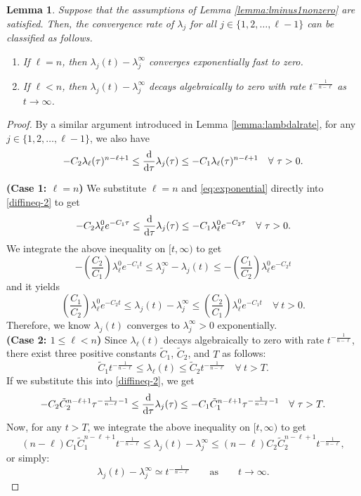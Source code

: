 \documentclass[11pt,reqno]{amsart}
\numberwithin{figure}{section}
\def\d {{\partial}}
\def\d{\mathrm{d}}
\renewcommand{\d}{  {\textup{d}} }
\newtheorem{lemma}{Lemma}[section]
\begin{document}
\begin{lemma}\label{rhodotestimate}
Suppose that the assumptions of Lemma \ref{lemma:lminus1nonzero} are satisfied. Then, the convergence rate of $\lambda_j$ for all $j\in\{1, 2, \dots, \ell-1\}$ can be classified as follows.

\begin{enumerate}
\item If $\ell=n$, then $\lambda_j(t)-\lambda_j^\infty$ converges exponentially fast to zero.

\item If $\ell<n$, then $\lambda_j(t)-\lambda_j^\infty$ decays algebraically to zero with rate $t^{-\frac{1}{n-\ell}}$ as $t\to\infty$.
\end{enumerate}
\end{lemma}


\begin{proof}
By a similar argument introduced in Lemma \ref{lemma:lambdalrate}, for any $j\in\{1, 2, \dots, \ell-1\}$, we also have
\begin{align}\label{diffineq-2}
-C_2\lambda_{\ell}(\tau)^{n-\ell+1}\leq\frac{\d}{\d \tau}\lambda_j(\tau)\leq-C_1\lambda_{\ell}(\tau)^{n-\ell+1}\quad\forall~\tau>0.
\end{align}


\noindent\textbf{(Case 1: $\ell=n$)} We substitute $\ell=n$ and \eqref{eq:exponential} directly into \eqref{diffineq-2} to get
\[
-C_2\lambda_{\ell}^0e^{-C_1\tau}\leq
\frac{\d}{\d \tau}\lambda_j(\tau)\leq-C_1\lambda_{\ell}^0e^{-C_2\tau}
\quad\forall~\tau>0.
\]
We integrate the above inequality on $[t,\infty)$ to get
\[
-\left(\frac{C_2}{C_1}\right)\lambda_{\ell}^0e^{-C_1t}\leq \lambda_j^\infty-\lambda_j(t)\leq -\left(\frac{C_1}{C_2}\right)\lambda_{\ell}^0e^{-C_2t}
\]
and it yields
\[
\left(\frac{C_1}{C_2}\right)\lambda_{\ell}^0e^{-C_2t}\leq \lambda_j(t)-\lambda_j^\infty\leq \left(\frac{C_2}{C_1}\right)\lambda_{\ell}^0e^{-C_1t}\quad\forall~t>0.
\]
Therefore, we know $\lambda_j(t)$ converges to $\lambda_j^\infty>0$ exponentially.\\ 

\noindent\textbf{(Case 2: $1\leq \ell<n$)} Since $\lambda_{\ell}(t)$ decays algebraically to zero with rate $t^{-\frac{1}{n-\ell}}$, there exist three positive constants $\tilde{C}_1$, $\tilde{C}_2$, and $T$ as follows:
\[
\tilde{C}_1t^{-\frac{1}{n-\ell}}\leq\lambda_{\ell}(t)\leq \tilde{C}_2t^{-\frac{1}{n-\ell}}\quad\forall~t>T.
\]
If we substitute this into \eqref{diffineq-2}, we get
\[
-C_2\tilde{C}_2^{n-\ell+1}\tau^{-\frac{1}{n-\ell}-1}\leq\frac{\d}{\d \tau}\lambda_j(\tau)\leq-C_1\tilde{C}_1^{n-\ell+1}\tau^{-\frac{1}{n-\ell}-1}
\quad\forall~\tau>T.
\]
Now, for any $t>T$, we integrate the above inequality on $[t, \infty)$ to get
\[
(n-\ell)C_1\tilde{C}_1^{n-\ell+1}t^{-\frac{1}{n-\ell}}\leq \lambda_j(t)-\lambda_j^\infty\leq (n-\ell)C_2\tilde{C}_2^{n-\ell+1}t^{-\frac{1}{n-\ell}},
\]
or simply:
\[
\lambda_j(t)-\lambda_j^\infty\simeq t^{-\frac{1}{n-\ell}}
\qquad \text{as}\qquad t\to\infty.
\]
\end{proof}
\end{document}
